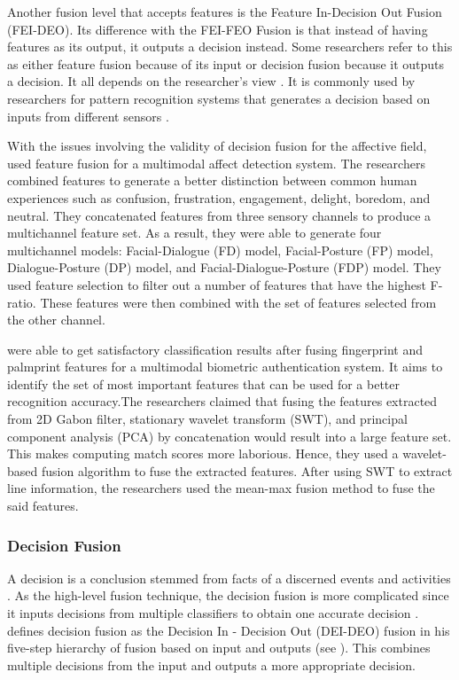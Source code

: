 Another fusion level that accepts features is the Feature In-Decision Out Fusion (FEI-DEO). Its difference with the FEI-FEO Fusion is that instead of having features as its output, it outputs a decision instead. Some researchers refer to this as either feature fusion because of its input or decision fusion because it outputs a decision. It all depends on the researcher’s view  . It is commonly used by researchers for pattern recognition systems that generates a decision based on inputs from different sensors .

With the issues involving the validity of decision fusion for the affective field,  used feature fusion for a multimodal affect detection system. The researchers combined features to generate a better distinction between common human experiences such as confusion, frustration, engagement, delight, boredom, and neutral. They concatenated features from three sensory channels to produce a multichannel feature set. As a result, they were able to generate four multichannel models: Facial-Dialogue (FD) model, Facial-Posture (FP) model, Dialogue-Posture (DP) model, and Facial-Dialogue-Posture (FDP) model. They used feature selection to filter out a number of features that have the highest F-ratio. These features were then combined with the set of features selected from the other channel. 

 were able to get satisfactory classification results after fusing fingerprint and palmprint features for a multimodal biometric authentication system. It aims to identify the set of most important features that can be used for a better recognition accuracy.The researchers claimed that fusing the features extracted from 2D Gabon  filter, stationary wavelet transform (SWT), and principal component analysis (PCA) by concatenation would result into a large feature set. This makes computing match scores more laborious. Hence, they used a wavelet-based fusion algorithm to fuse the extracted features. After using SWT to extract line information, the researchers used the mean-max fusion method to fuse the said features.

\subsubsection{Decision Fusion}
A decision is a conclusion stemmed from facts of a discerned events and activities . As the high-level fusion technique, the decision fusion is more complicated since it inputs decisions from multiple classifiers to obtain one accurate decision .  defines decision fusion as the Decision In - Decision Out (DEI-DEO) fusion in his five-step hierarchy of fusion based on input and outputs (see ). This combines multiple decisions from the input and outputs a more appropriate decision.



